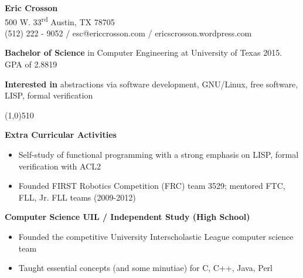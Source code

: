 \documentclass{report}
\newcommand{\cut}{\begin{center} \line(1,0){510} \end{center}}
\begin{document}
\pagestyle{empty}
\setlength\parindent{0pt}

\begin{center}
  \textbf{Eric Crosson} \\
  500 W. 33\textsuperscript{rd} Austin, TX 78705 \\
  (512) 222 - 9052 / esc@ericcrosson.com / ericscrosson.wordpress.com
\end{center}


\textbf{Bachelor of Science} in Computer Engineering at
University of Texas 2015. GPA of 2.8819

\textbf{Interested in} abstractions via software development, GNU/Linux, free software, LISP, formal verification

\cut{}

\textbf{Extra Curricular Activities}
\begin{itemize}
  \renewcommand{\labelitemi}{$\circ$}
\item Self-study of functional programming with a strong emphasis on LISP, formal verification with ACL2
\item Founded FIRST Robotics Competition (FRC) team 3529; mentored FTC, FLL, Jr. FLL teams (2009-2012)
\end{itemize}

\textbf{Computer Science UIL / Independent Study (High School)}
\begin{itemize}
  \renewcommand{\labelitemi}{$\circ$}
\item Founded the competitive University Interscholastic League computer science team
\item Taught essential concepts (and some minutiae) for C, C++, Java, Perl
\end{itemize}
\end{document}
